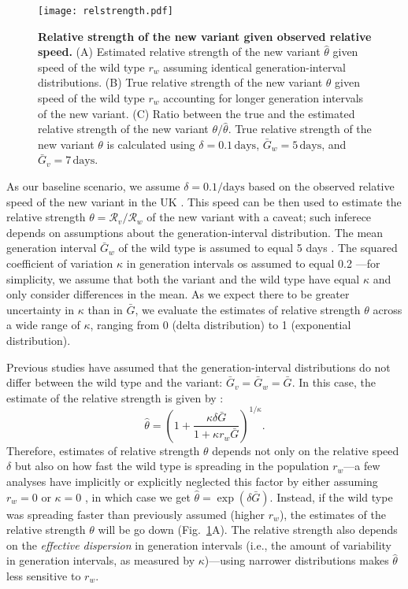 \documentclass[12pt]{article}
\newcommand{\fref}[1]{Fig.~\ref{fig:#1}}
\newcommand{\RR}{\ensuremath{{\mathcal R}}\xspace}
\begin{document}
\begin{figure}[!th]
\texttt{[image: relstrength.pdf]}
\caption{
\textbf{Relative strength of the new variant given observed relative speed.}
(A) Estimated relative strength of the new variant $\hat{\theta}$ given speed of the wild type
$r_w$ assuming identical generation-interval distributions.
(B) True relative strength of the new variant $\theta$ given speed of the wild type $r_w$ accounting for longer generation intervals of the new variant.
(C) Ratio between the true and the estimated relative strength of the new variant $\theta/\hat{\theta}$.
True relative strength of the new variant $\theta$ is calculated using $\delta=0.1\,\textrm{days}$, $\bar{G}_w = 5\,\textrm{days}$, and $\bar{G}_v = 7\,\textrm{days}$.
}
\label{fig:relstrength}
\end{figure}

As our baseline scenario, we assume $\delta = 0.1/\textrm{days}$ based on the observed relative speed of the new variant in the UK \citep{davies2021estimated}.
This speed can be then used to estimate the relative strength $\theta = \RR_v/\RR_w$ of the new variant with a caveat; such inferece depends on assumptions about the generation-interval distribution.
The mean generation interval $\bar{G}_w$ of the wild type is assumed to equal 5 days \citep{ferretti2020quantifying}.
The squared coefficient of variation $\kappa$ in generation intervals os assumed to equal 0.2 \citep{ferretti2020quantifying}---for simplicity, we assume that both the variant and the wild type have equal $\kappa$ and only consider differences in the mean.
As we expect there to be greater uncertainty in $\kappa$ than in $\bar{G}$, we evaluate the estimates of relative strength $\theta$ across a wide range of $\kappa$, ranging from 0 (delta distribution) to 1 (exponential distribution).

Previous studies have assumed that the generation-interval distributions do not differ between the wild type and the variant: $\bar{G}_v = \bar{G}_w = \bar{G}$.
In this case, the estimate of the relative strength is given by \citep{park2019practical}:
\begin{equation}
\hat{\theta} = \left(1 + \frac{\kappa \delta \bar{G}}{1 + \kappa r_w \bar{G}}\right)^{1/\kappa}.
\end{equation}
Therefore, estimates of relative strength $\theta$ depends not only on the relative speed $\delta$ but also on how fast the wild type is spreading in the population $r_w$---a few analyses have implicitly or explicitly neglected this factor by either assuming $r_w = 0$ \citep{switzerland2021variant} or $\kappa = 0$ \citep{davies2021estimated}, in which case we get $\hat{\theta} = \exp(\delta \bar{G})$.
Instead, if the wild type was spreading faster than previously assumed (higher $r_w$), the estimates of the relative strength $\theta$ will be go down (\fref{relstrength}A).
The relative strength also depends on the \emph{effective dispersion} in generation intervals (i.e., the amount of variability in generation intervals, as measured by $\kappa$)---using narrower distributions makes $\hat{\theta}$ less sensitive to $r_w$.
\end{document}
